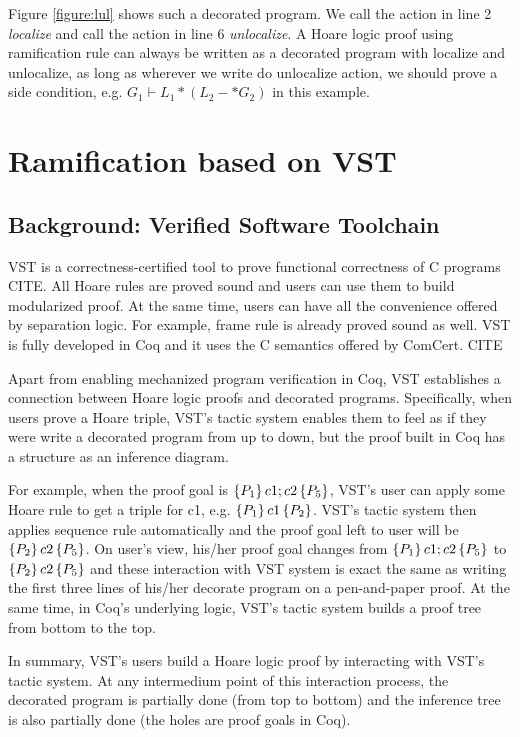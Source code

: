 {Figure \ref{figure:lul} shows such a decorated program. We call the action in line 2 \emph{localize} and call the action in line 6 \emph{unlocalize}. A Hoare logic proof using ramification rule can always be written as a decorated program with localize and unlocalize, as long as wherever we write do unlocalize action, we should prove a side condition, e.g. $G_1 \vdash L_1 * (L_2 -* G_2)$ in this example.
}

\section{Ramification based on VST}\label{vst}

\subsection{Background: Verified Software Toolchain}
VST is a correctness-certified tool to prove functional correctness of C programs CITE. All Hoare rules are proved sound and users can use them to build modularized proof. At the same time, users can have all the convenience offered by separation logic. For example, frame rule is already proved sound as well. VST is fully developed in Coq and it uses the C semantics offered by ComCert. CITE

Apart from enabling mechanized program verification in Coq, VST establishes a connection between Hoare logic proofs and decorated programs. Specifically, when users prove a Hoare triple, VST's tactic system enables them to feel as if they were write a decorated program from up to down, but the proof built in Coq has a structure as an inference diagram.

For example, when the proof goal is $\{P_1\}\,c1;c2\,\{P_5\}$, VST's user can apply some Hoare rule to get a triple for c1, e.g. $\{P_1\}\,c1\,\{P_2\}$. VST's tactic system then applies sequence rule automatically and the proof goal left to user will be $\{P_2\}\,c2\,\{P_5\}$. On user's view, his/her proof goal changes from $\{P_1\}\,c1;c2\,\{P_5\}$ to $\{P_2\}\,c2\,\{P_5\}$ and these interaction with VST system is exact the same as writing the first three lines of his/her decorate program on a pen-and-paper proof. At the same time, in Coq's underlying logic, VST's tactic system builds a proof tree from bottom to the top.

In summary, VST's users build a Hoare logic proof by interacting with VST's tactic system. At any intermedium point of this interaction process, the decorated program is partially done (from top to bottom) and the inference tree is also partially done (the holes are proof goals in Coq).

